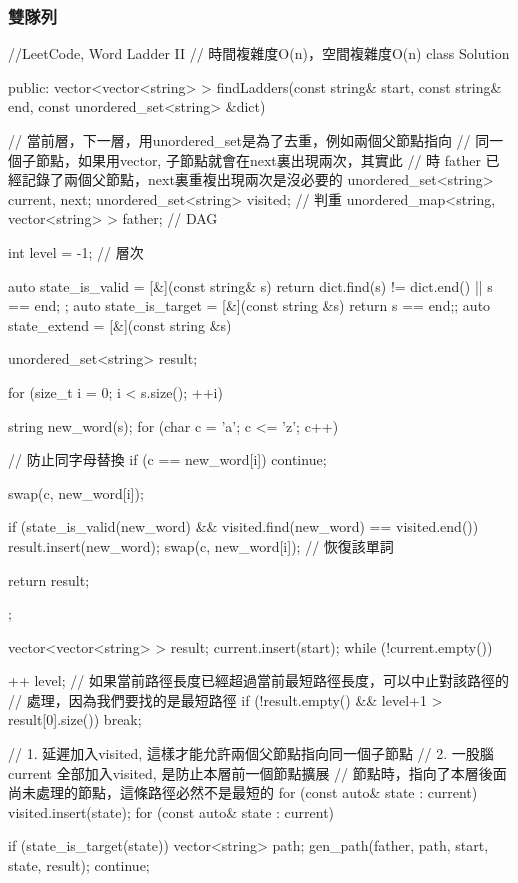 \subsubsection{雙隊列}

\begin{Code}
//LeetCode, Word Ladder II
// 時間複雜度O(n)，空間複雜度O(n)
class Solution {
public:
    vector<vector<string> > findLadders(const string& start,
            const string& end, const unordered_set<string> &dict) {
        // 當前層，下一層，用unordered_set是為了去重，例如兩個父節點指向
        // 同一個子節點，如果用vector, 子節點就會在next裏出現兩次，其實此
        // 時 father 已經記錄了兩個父節點，next裏重複出現兩次是沒必要的
        unordered_set<string> current, next;
        unordered_set<string> visited; // 判重
        unordered_map<string, vector<string> > father; // DAG

        int level = -1;  // 層次

        auto state_is_valid = [&](const string& s) {
            return dict.find(s) != dict.end() || s == end;
        };
        auto state_is_target = [&](const string &s) {return s == end;};
        auto state_extend = [&](const string &s) {
            unordered_set<string> result;

            for (size_t i = 0; i < s.size(); ++i) {
                string new_word(s);
                for (char c = 'a'; c <= 'z'; c++) {
                    // 防止同字母替換
                    if (c == new_word[i]) continue;

                    swap(c, new_word[i]);

                    if (state_is_valid(new_word) &&
                            visited.find(new_word) == visited.end()) {
                        result.insert(new_word);
                    }
                    swap(c, new_word[i]); // 恢復該單詞
                }
            }

            return result;
        };

        vector<vector<string> > result;
        current.insert(start);
        while (!current.empty()) {
            ++ level;
            // 如果當前路徑長度已經超過當前最短路徑長度，可以中止對該路徑的
            // 處理，因為我們要找的是最短路徑
            if (!result.empty() && level+1 > result[0].size()) break;

            // 1. 延遲加入visited, 這樣才能允許兩個父節點指向同一個子節點
            // 2. 一股腦current 全部加入visited, 是防止本層前一個節點擴展
            // 節點時，指向了本層後面尚未處理的節點，這條路徑必然不是最短的
            for (const auto& state : current)
                visited.insert(state);
            for (const auto& state : current) {
                if (state_is_target(state)) {
                    vector<string> path;
                    gen_path(father, path, start, state, result);
                    continue;
                }

}}}}
\end{Code}
